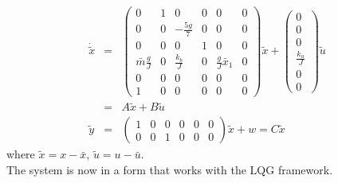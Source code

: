 \begin{eqnarray*}
\dot{\tilde{x}} & = & \begin{pmatrix}0 & 1 & 0 & 0 & 0 & 0\\
0 & 0 & -\frac{5g}{7} & 0 & 0 & 0\\
0 & 0 & 0 & 1 & 0 & 0\\
\bar{m}\frac{g}{J} & 0 & \frac{k_b}{J} & 0 & \frac{g}{J}\bar{x}_{1} & 0\\
0 & 0 & 0 & 0 & 0 & 0\\
1 & 0 & 0 & 0 & 0 & 0
\end{pmatrix}\tilde{x}+\begin{pmatrix}0\\
0\\
0\\
\frac{k_{u}}{J}\\
0\\
0
\end{pmatrix}\tilde{u}\\
 & = & A\tilde{x}+B\tilde{u}\\
\tilde{y} & = & \begin{pmatrix}1 & 0 & 0 & 0 & 0 & 0\\
0 & 0 & 1 & 0 & 0 & 0
\end{pmatrix}\tilde{x}+w=C\tilde{x}
\end{eqnarray*}
where $\tilde{x}=x-\bar{x}$, $\tilde{u}=u-\bar{u}$.
\\
The system is now in a form that works with the LQG framework.







